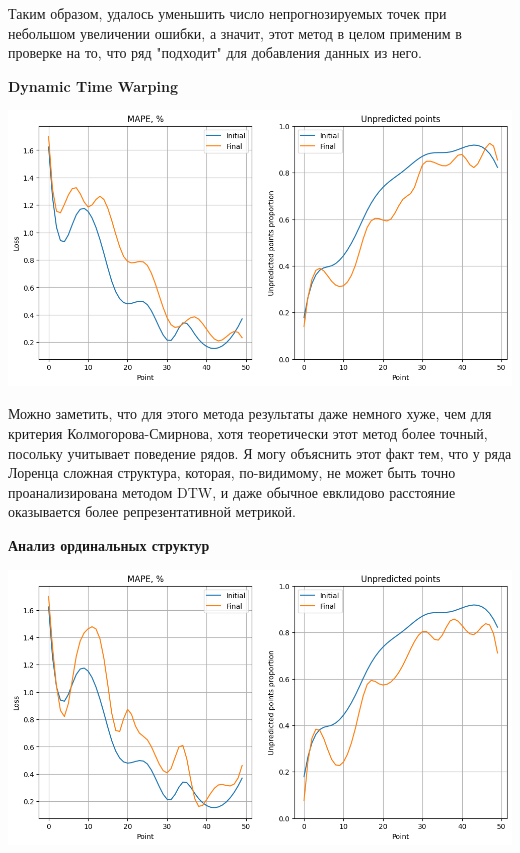 \documentclass[a4paper, 12pt]{extarticle}
\begin{document}
Таким образом, удалось уменьшить число непрогнозируемых точек при небольшом увеличении ошибки, а значит, этот метод в целом применим в проверке на то, что ряд "подходит" для добавления данных из него.

\begin{center}
    \textbf{Dynamic Time Warping}
\end{center}

\begin{center}
    \includegraphics[width=\textwidth]{img/dtw.png}
\end{center}

Можно заметить, что для этого метода результаты даже немного хуже, чем для критерия Колмогорова-Смирнова, хотя теоретически этот метод более точный, посольку учитывает поведение рядов. Я могу объяснить этот факт тем, что у ряда Лоренца сложная структура, которая, по-видимому, не может быть точно проанализирована методом DTW, и даже обычное евклидово расстояние оказывается более репрезентативной метрикой.

\begin{center}
    \textbf{Анализ ординальных структур}
\end{center}

\begin{center}
    \includegraphics[width=\textwidth]{img/ord_str.png}
\end{center}
\end{document}
